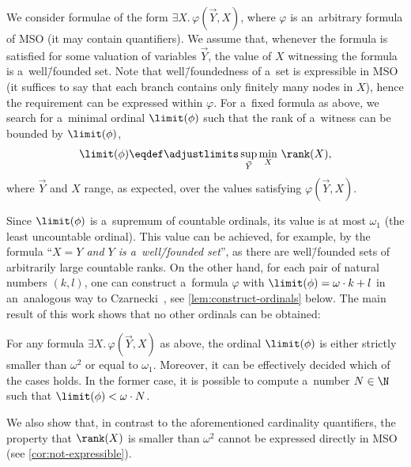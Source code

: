 We consider formulae of the form $\exists X.\, \varphi(\vec{Y}, X)$, where $\varphi$ is an~arbitrary formula of MSO (it may contain quantifiers).
We assume that, whenever the formula is satisfied for some valuation of variables $\vec{Y}$, the value of $X$ witnessing the formula is a~well\=/founded set.
Note that well\=/foundedness of a~set is expressible in MSO (it suffices to say that each branch contains only finitely many nodes in $X$),
hence the requirement can be expressed within $\varphi$.
For a~fixed formula as above, we search for a~minimal ordinal $\limit(\phi)$ such that the rank of a~witness can be bounded by $\limit(\phi)$,
\begin{equation}\label{eq:eta-for-phi}
	\limit(\phi) \eqdef\adjustlimits\sup_{\vec{Y}}\min_{X}\, \rank(X),
\end{equation}
where $\vec{Y}$ and $X$ range, as expected, over the values satisfying $\varphi(\vec{Y}, X)$.

Since $\limit(\phi)$ is a~supremum of countable ordinals, its value is at most $\omega_1$ (the least uncountable ordinal).
This value can be achieved, for example, by the formula ``\emph{$X = Y$ and $Y$ is a~well\=/founded set}'',
as there are well\=/founded sets of arbitrarily large countable ranks.
On the other hand, for each pair of natural numbers $(k,l)$, one can construct a~formula $\varphi$ with $\limit(\phi) = \omega\cdot k+l$
in an~analogous way to Czarnecki~\cite{czarnecki_closure_fics}, see \cref{lem:construct-ordinals} below.
The main result of this work shows that no other ordinals can be obtained:

\begin{thm}\label{thm:main}
	For any formula $\exists X.\, \varphi(\vec{Y}, X)$ as above, the ordinal $\limit(\phi)$ is either strictly smaller than $\omega^2$ or equal to $\omega_1$.
	Moreover, it can be effectively decided which of the cases holds.
	In the former case, it is possible to compute a~number $N\in\N$ such that $\limit(\phi)< \omega\cdot N$.
\end{thm}
\noindent %
We also show that, in contrast to the aforementioned cardinality quantifiers, the property that $\rank(X)$ is smaller than $\omega^2$ cannot be expressed directly in MSO (see \cref{cor:not-expressible}).


